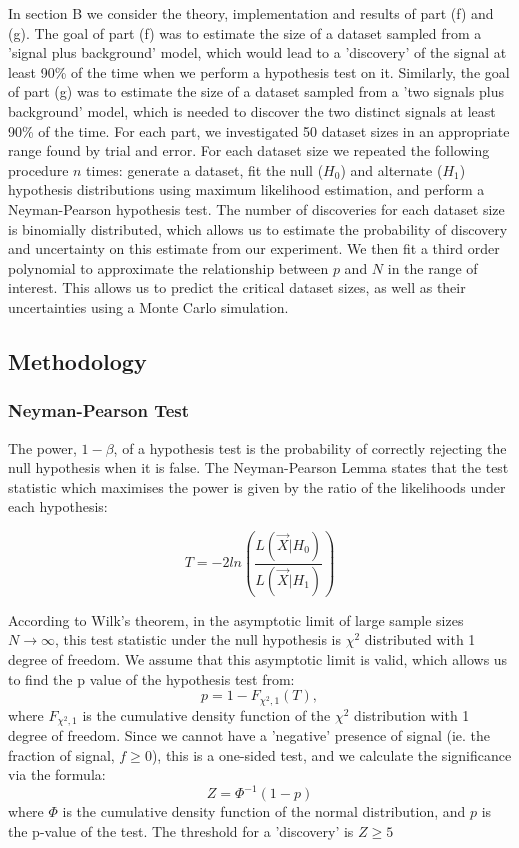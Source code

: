 \documentclass{article}
\begin{document}
In section B we consider the theory, implementation and results of part (f) and (g). The goal of part (f) was to estimate the size of a dataset sampled from a 'signal plus background' model, which would lead to a 'discovery' of the signal at least 90\% of the time when we perform a hypothesis test on it. Similarly, the goal of part (g) was to estimate the size of a dataset sampled from a 'two signals plus background' model, which is needed to discover the two distinct signals at least 90\% of the time. For each part, we investigated 50 dataset sizes in an appropriate range found by trial and error. For each dataset size we repeated the following procedure $n$ times: generate a dataset, fit the null ($H_0$) and alternate ($H_1$) hypothesis distributions using maximum likelihood estimation, and perform a Neyman-Pearson hypothesis test. The number of discoveries for each dataset size is binomially distributed, which allows us to estimate the probability of discovery and uncertainty on this estimate from our experiment. We then fit a third order polynomial to approximate the relationship between $p$ and $N$ in the range of interest. This allows us to predict the critical dataset sizes, as well as their uncertainties using a Monte Carlo simulation.  

\subsection*{Methodology}

\subsubsection*{Neyman-Pearson Test}

The power, $1-\beta$, of a hypothesis test is the probability of correctly rejecting the null hypothesis when it is false. The Neyman-Pearson Lemma states that the test statistic which maximises the power is given by the ratio of the likelihoods under each hypothesis:

\begin{equation}
T = -2ln\left( \frac{L(\vec{X}|H_0)}{L(\vec{X}|H_1)} \right)
\label{eq:test_statistic}
\end{equation}

According to Wilk's theorem, in the asymptotic limit of large sample sizes $N \to \infty$, this test statistic under the null hypothesis is $\chi^2$ distributed with 1 degree of freedom. We assume that this asymptotic limit is valid, which allows us to find the p value of the hypothesis test from:
$$
p = 1 - F_{\chi^2, 1}(T),
$$
where $F_{\chi^2, 1}$ is the cumulative density function of the $\chi^2$ distribution with 1 degree of freedom. Since we cannot have a 'negative' presence of signal (ie. the fraction of signal, $f \geq 0$), this is a one-sided test, and we calculate the significance via the formula:
$$
Z = \Phi^{-1}(1 - p)
$$
where $\Phi$ is the cumulative density function of the normal distribution, and $p$ is the p-value of the test. The threshold for a 'discovery' is $Z \geq 5$
\end{document}
